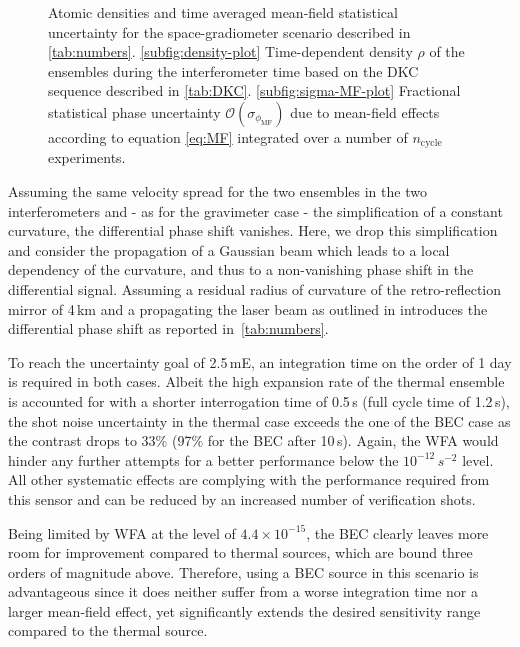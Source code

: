 \begin{figure}[h!]
    \centering
    \resizebox{0.9\linewidth}{!}{
        
        }
    \caption{Atomic densities and time averaged mean-field statistical uncertainty for the space-gradiometer scenario described in \autoref{tab:numbers}. \autoref{subfig:density-plot} Time-dependent density $\rho$ of the ensembles during the interferometer time based on the DKC sequence described in \autoref{tab:DKC}. \autoref{subfig:sigma-MF-plot} Fractional statistical phase uncertainty $\mathcal{O}(\sigma_{\phi_\text{MF}})$ due to mean-field effects according to equation \autoref{eq:MF} integrated over a number of $n_\text{cycle}$ experiments. }
    \label{fig:MF-effects}
\end{figure}

Assuming the same velocity spread for the two ensembles in the two interferometers and - as for the gravimeter case - the simplification of a constant curvature, the differential phase shift vanishes. Here, we drop this simplification and consider the propagation of a Gaussian beam which leads to a local dependency of the curvature, and thus to a non-vanishing phase shift in the differential signal. Assuming a residual radius of curvature of the retro-reflection mirror of 4\,km and a propagating the laser beam as outlined in \cite{Trimeche2019} introduces the differential phase shift as reported in~\autoref{tab:numbers}.
 
To reach the uncertainty goal of 2.5\,mE, an integration time on the order of 1 day is required in both cases. Albeit the high expansion rate of the thermal ensemble is accounted for with a shorter interrogation time of 0.5\,s (full cycle time of 1.2\,s), the shot noise uncertainty in the thermal case exceeds the one of the BEC case as the contrast drops to 33\% (97\% for the BEC after 10\,s).
Again, the WFA would hinder any further attempts for a better performance below the $10^{-12}\,s^{-2}$ level. All other systematic effects are complying with the performance required from this sensor and can be reduced by an increased number of verification shots. 

Being limited by WFA at the level of $4.4\times10^{-15}$, the BEC clearly leaves more room for improvement compared to thermal sources, which are bound three orders of magnitude above. Therefore, using a BEC source in this scenario is advantageous since it does neither suffer from a worse integration time nor a larger mean-field effect, yet significantly extends the desired sensitivity range compared to the thermal source.

